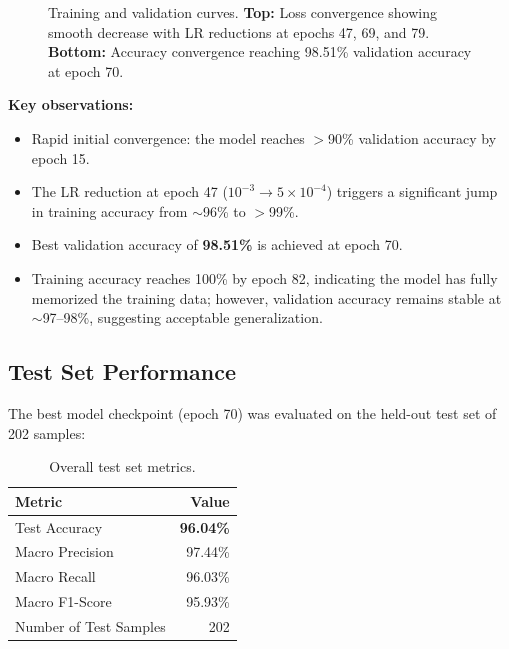 \documentclass[12pt, a4paper]{article}
\begin{document}
\begin{figure}[H]
    \caption{Training and validation curves. \textbf{Top:} Loss convergence showing smooth decrease with LR reductions at epochs 47, 69, and 79. \textbf{Bottom:} Accuracy convergence reaching 98.51\% validation accuracy at epoch 70.}
    \label{fig:training_curves}
\end{figure}

\textbf{Key observations:}
\begin{itemize}
    \item Rapid initial convergence: the model reaches $>$90\% validation accuracy by epoch 15.
    \item The LR reduction at epoch 47 ($10^{-3} \to 5 \times 10^{-4}$) triggers a significant jump in training accuracy from $\sim$96\% to $>$99\%.
    \item Best validation accuracy of \textbf{98.51\%} is achieved at epoch 70.
    \item Training accuracy reaches 100\% by epoch 82, indicating the model has fully memorized the training data; however, validation accuracy remains stable at $\sim$97--98\%, suggesting acceptable generalization.
\end{itemize}

\subsection{Test Set Performance}

The best model checkpoint (epoch 70) was evaluated on the held-out test set of 202 samples:

\begin{table}[H]
    \centering
    \caption{Overall test set metrics.}
    \label{tab:overall_metrics}
    \begin{tabular}{lr}
        \toprule
        \textbf{Metric} & \textbf{Value} \\
        \midrule
        Test Accuracy & \textbf{96.04\%} \\
        Macro Precision & 97.44\% \\
        Macro Recall & 96.03\% \\
        Macro F1-Score & 95.93\% \\
        Number of Test Samples & 202 \\
        \bottomrule
    \end{tabular}
\end{table}
\end{document}
